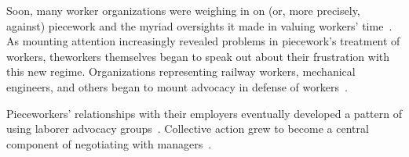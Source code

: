 \documentclass[trackingWork]{subfiles}
\begin{document}
Soon, many worker organizations were weighing in on (or, more precisely, against) piecework and the myriad oversights it made in valuing workers' time~\cite{american1921problem,richards1904anything}.
As mounting attention increasingly revealed problems in piecework's treatment of workers, theworkers themselves began to speak out about their frustration with this new regime.
Organizations representing railway workers, mechanical engineers, and others began to mount advocacy in defense of workers~\cite{american1921problem,richards1904anything}.



Pieceworkers' relationships with their employers eventually developed a pattern of using 
laborer advocacy groups~\cite{levi2009union,ahlquist2013interest,
      mccallum2013global,jacoby1983union}.
Collective action grew to become a central component of negotiating with managers~\cite{russell1982collective,olsonlogic}.
\end{document}
